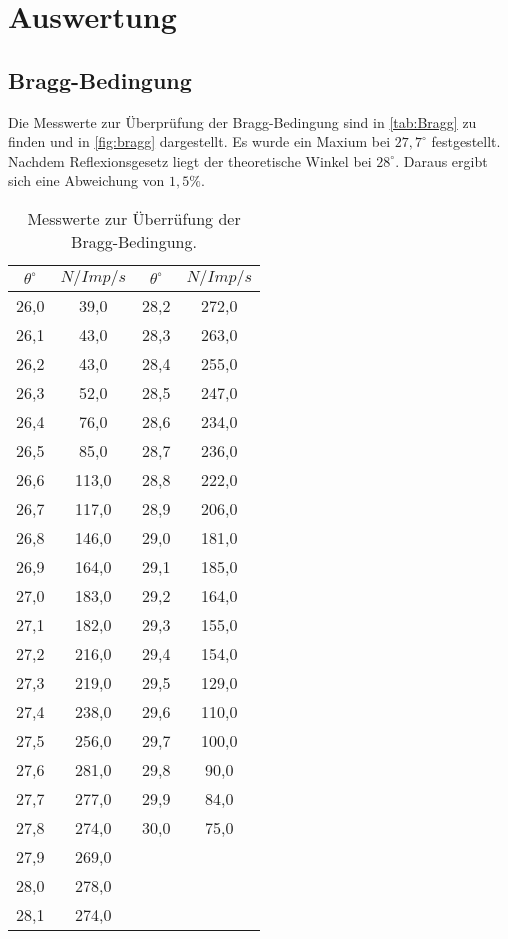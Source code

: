 \section{Auswertung}
\label{sec:Auswertung}

\subsection{Bragg-Bedingung}
\label{sec:Bragg}

Die Messwerte zur Überprüfung der Bragg-Bedingung sind in \autoref{tab:Bragg} zu finden und in \autoref{fig:bragg}
dargestellt. Es wurde ein Maxium bei $27,7^{\circ}$ festgestellt. Nachdem Reflexionsgesetz liegt der
theoretische Winkel bei $28^{\circ}$. Daraus ergibt sich eine Abweichung von $1,5\%$.

\begin{table}
  \centering
  \begin{tabular}{c c | c c}
    \toprule
    $\theta^{\circ}$ & $N/Imp/s$ & $\theta^{\circ}$ & $N/Imp/s$ \\
    \midrule
    26,0 &  39,0 & 28,2 & 272,0 \\
    26,1 &  43,0 & 28,3 & 263,0 \\
    26,2 &  43,0 & 28,4 & 255,0 \\
    26,3 &  52,0 & 28,5 & 247,0 \\
    26,4 &  76,0 & 28,6 & 234,0 \\
    26,5 &  85,0 & 28,7 & 236,0 \\
    26,6 & 113,0 & 28,8 & 222,0 \\
    26,7 & 117,0 & 28,9 & 206,0 \\
    26,8 & 146,0 & 29,0 & 181,0 \\
    26,9 & 164,0 & 29,1 & 185,0 \\
    27,0 & 183,0 & 29,2 & 164,0 \\
    27,1 & 182,0 & 29,3 & 155,0 \\
    27,2 & 216,0 & 29,4 & 154,0 \\
    27,3 & 219,0 & 29,5 & 129,0 \\
    27,4 & 238,0 & 29,6 & 110,0 \\
    27,5 & 256,0 & 29,7 & 100,0 \\
    27,6 & 281,0 & 29,8 &  90,0 \\
    27,7 & 277,0 & 29,9 &  84,0 \\
    27,8 & 274,0 & 30,0 &  75,0 \\
    27,9 & 269,0 & & \\
    28,0 & 278,0 & & \\
    28,1 & 274,0 & & \\
    \bottomrule
  \end{tabular}
  \caption{Messwerte zur Überrüfung der Bragg-Bedingung.}
  \label{tab:Bragg}
\end{table}

